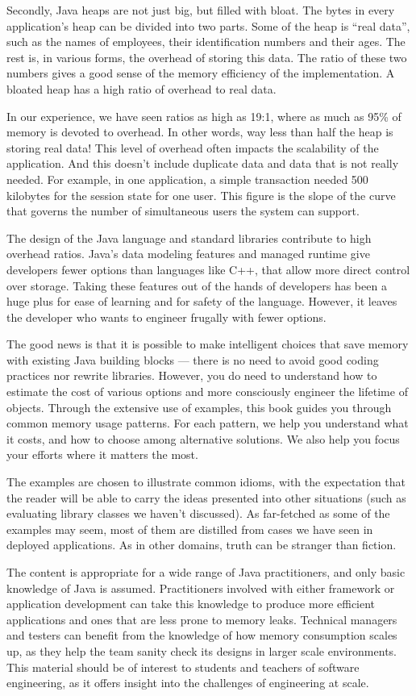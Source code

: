 Secondly, Java heaps
are not just big, but filled with bloat. The bytes in every application's heap can be divided into two
parts. Some of the heap is ``real data'', such as the names of employees, their
identification numbers and their ages. The rest is, in various forms, the
overhead of storing this data. The ratio of these two numbers gives a good sense of the
memory efficiency of the implementation. A bloated heap has a high ratio of
overhead to real data.

In our experience, we have seen ratios as high as 19:1, where as much as 95\%
of memory is devoted to overhead. In other words,
way less than half the heap is storing real data! This level of overhead often
impacts the scalability of the application. And this doesn't include duplicate
data and data that is not really needed. For example, in one application, a
simple transaction needed 500 kilobytes for the session state for one user. This
figure is the slope of the curve that governs the number of simultaneous users the system can support.  

The design of the Java language and standard libraries contribute to high
overhead ratios. Java's data modeling features and managed runtime give
developers fewer options than languages like C++, that allow more direct control over
storage. Taking these features out of the hands of developers has been a huge
plus for ease of learning and for safety of the language. However, it leaves the
developer who wants to engineer frugally with fewer options. 

The good news is that it is possible to make intelligent choices that save
memory with existing Java building blocks --- there is no need to avoid good
coding practices nor rewrite libraries. However, you do need to understand how
to estimate the cost of various options and more consciously engineer the
lifetime of objects. Through the extensive use of examples, this book guides you
through common memory usage patterns. For each pattern, we help you understand
what it costs, and how to choose among alternative solutions. We also help you
focus your efforts where it matters the most.

The examples are chosen to illustrate common idioms, with the expectation that
the reader will be able to carry the ideas presented into other situations
(such as evaluating library classes we haven't discussed). As far-fetched as
some of the examples may seem, most of them are distilled from cases we have seen 
in deployed applications. As in other domains, truth can be stranger than
fiction.

The content is appropriate for a wide range of Java practitioners, and only
basic knowledge of Java is assumed.
Practitioners involved with either framework or application development can
take this knowledge to produce more efficient applications and ones that are less prone to memory leaks.
Technical managers and testers can benefit from the knowledge of how memory
consumption scales up, as they help the team sanity check its designs in larger
scale environments.
This material should be of interest to students and teachers of software
engineering, as it offers insight into the challenges of engineering at scale.


